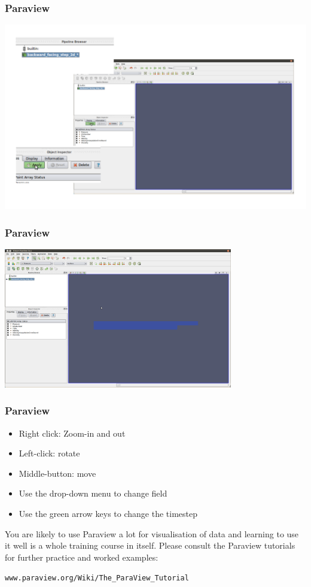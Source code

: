 \documentclass[12pt]{beamer}
\begin{document}
\begin{frame}
    \frametitle{Paraview}
\begin{center}
\includegraphics[width=\textwidth]{images/paraview_after_open.png}
\end{center}
\end{frame}
\begin{frame}
    \frametitle{Paraview}
\begin{center}
\includegraphics[width=0.75\textwidth]{images/paraview_after_loading.png}
\end{center}
\end{frame}
\begin{frame}
    \frametitle{Paraview}
\begin{itemize}
\item Right click: Zoom-in and out
\item Left-click: rotate
\item Middle-button: move
\item Use the drop-down menu to change field
\item Use the green arrow keys to change the timestep
\end{itemize}
You are likely to use Paraview a lot for visualisation of data
and learning to use it well is a whole training course in itself.
Please consult the Paraview tutorials for further practice and worked examples:\\
\begin{center}
 {\tt www.paraview.org/Wiki/The\_ParaView\_Tutorial}
\end{center}

\end{frame}
\end{document}
